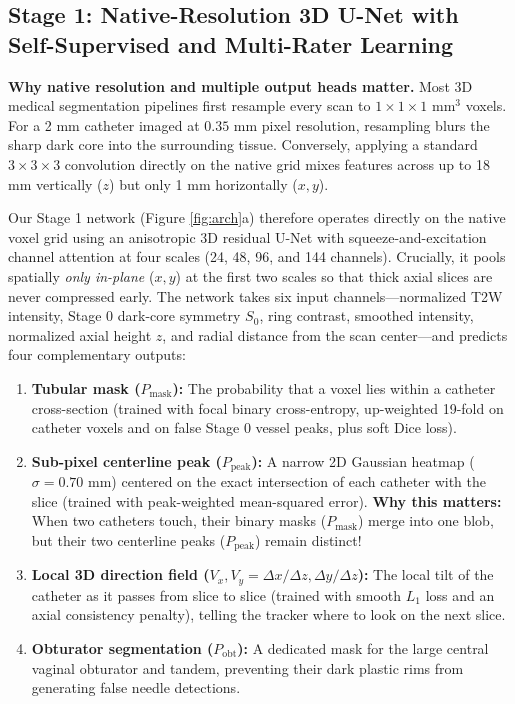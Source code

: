 \documentclass[
  11pt,
]{article}
\providecommand{\tightlist}{%
  \setlength{\itemsep}{0pt}\setlength{\parskip}{0pt}}
\begin{document}
\subsection{Stage 1: Native-Resolution 3D U-Net with Self-Supervised and
Multi-Rater
Learning}\label{stage-1-native-resolution-3d-u-net-with-self-supervised-and-multi-rater-learning}

\textbf{Why native resolution and multiple output heads matter.} Most 3D
medical segmentation pipelines first resample every scan to
\(1 \times 1 \times 1\text{ mm}^3\) voxels. For a 2 mm catheter imaged
at \(0.35\text{ mm}\) pixel resolution, resampling blurs the sharp dark
core into the surrounding tissue. Conversely, applying a standard
\(3 \times 3 \times 3\) convolution directly on the native grid mixes
features across up to 18 mm vertically (\(z\)) but only 1 mm
horizontally (\(x, y\)).

Our Stage 1 network (Figure \ref{fig:arch}a) therefore operates directly
on the native voxel grid using an anisotropic 3D residual U-Net with
squeeze-and-excitation channel attention at four scales (24, 48, 96, and
144 channels). Crucially, it pools spatially \emph{only in-plane}
(\(x, y\)) at the first two scales so that thick axial slices are never
compressed early. The network takes six input channels---normalized T2W
intensity, Stage 0 dark-core symmetry \(S_0\), ring contrast, smoothed
intensity, normalized axial height \(z\), and radial distance from the
scan center---and predicts four complementary outputs:

\begin{enumerate}
\def\labelenumi{\arabic{enumi}.}
\tightlist
\item
  \textbf{Tubular mask (\(P_{\text{mask}}\)):} The probability that a
  voxel lies within a catheter cross-section (trained with focal binary
  cross-entropy, up-weighted 19-fold on catheter voxels and on false
  Stage 0 vessel peaks, plus soft Dice loss).
\item
  \textbf{Sub-pixel centerline peak (\(P_{\text{peak}}\)):} A narrow 2D
  Gaussian heatmap (\(\sigma = 0.70\text{ mm}\)) centered on the exact
  intersection of each catheter with the slice (trained with
  peak-weighted mean-squared error). \textbf{Why this matters:} When two
  catheters touch, their binary masks (\(P_{\text{mask}}\)) merge into
  one blob, but their two centerline peaks (\(P_{\text{peak}}\)) remain
  distinct!
\item
  \textbf{Local 3D direction field
  (\(V_x, V_y = \Delta x/\Delta z, \Delta y/\Delta z\)):} The local tilt
  of the catheter as it passes from slice to slice (trained with smooth
  \(L_1\) loss and an axial consistency penalty), telling the tracker
  where to look on the next slice.
\item
  \textbf{Obturator segmentation (\(P_{\text{obt}}\)):} A dedicated mask
  for the large central vaginal obturator and tandem, preventing their
  dark plastic rims from generating false needle detections.
\end{enumerate}
\end{document}
